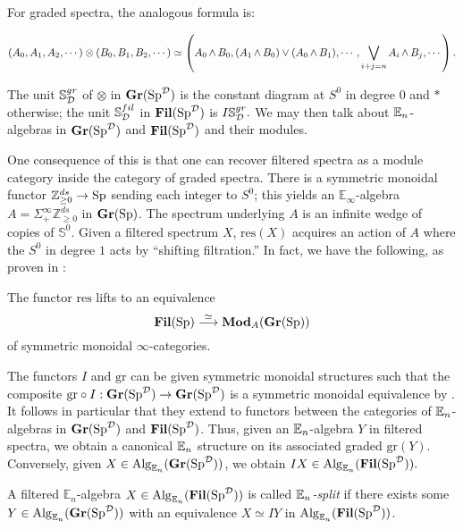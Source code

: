 For graded spectra, the analogous formula is:

$$(A_0,A_1,A_2,\cdots) \otimes (B_0,B_1,B_2,\cdots) \simeq \left( A_0 \smsh B_0, (A_1 \smsh B_0) \vee (A_0 \smsh B_1), \cdots, \bigvee_{i+j=n} A_i \smsh B_j, \cdots \right).$$


The unit $\mathbb{S}^{gr}_{\D}$ of $\otimes$ in $\Gr(\Sp^{\D})$ is the constant diagram at $S^0$ in degree 0 and $*$ otherwise; the unit $\mathbb{S}^{fil}_{\D}$ in $\Fil(\Sp^{\D})$ is $I\mathbb{S}^{gr}_{\D}.$  We may then talk about $\E_n$-algebras in $\Gr(\Sp^{\D})$ and $\Fil(\Sp^{\D})$ and their modules.

\begin{rmk}
One consequence of this is that one can recover filtered spectra as a module category inside the category of graded spectra.  There is a symmetric monoidal functor $\mathbb{Z}^{ds}_{\ge 0} \to \Sp$ sending each integer to $S^0$; this yields an $\mathbb{E}_\infty$-algebra $A=\Sigma^{\infty}_+ \mathbb{Z}^{ds}_{\ge 0}$ in $\Gr(\Sp)$.  The spectrum underlying $A$ is an infinite wedge of copies of $\mathbb{S}^0$.  Given a filtered spectrum $X$, $\mathrm{res }(X)$ acquires an action of $A$ where the $S^0$ in degree $1$ acts by ``shifting filtration.''  In fact, we have the following, as proven in \cite[Proposition 3.1.6]{LurieRot}:

\begin{lem} \label{lem:FilAsGrMod}
The functor $\mathrm{res}$ lifts to an equivalence
$$\Fil(\Sp) \stackrel{\simeq}{\longrightarrow} \mathbf{Mod}_{A}(\Gr(\Sp))$$
of symmetric monoidal $\infty$-categories.
\end{lem}
\end{rmk}  


The functors $I$ and $\text{gr}$ can be given symmetric monoidal structures such that the composite $\text{gr}\circ I : \Gr(\Sp^{\D}) \to \Gr(\Sp^{\D})$ is a symmetric monoidal equivalence by \cite[Proposition 3.2.1]{LurieRot}.  It follows in particular that they extend to functors between the categories of $\E_n$-algebras in $\Gr(\Sp^{\D})$ and $\Fil(\Sp^{\D})$.  Thus, given an $\E_n$-algebra $Y$ in filtered spectra, we obtain a canonical $\E_n$ structure on its associated graded $\text{gr}(Y).$  Conversely, given $X\in \Alg_{\E_n}(\Gr(\Sp^{\D}))$, we obtain $IX\in \Alg_{\E_n}(\Fil(\Sp^{\D})).$  

\begin{dfn}
A filtered $\mathbb{E}_n$-algebra $X\in \Alg_{\E_n}(\Fil(\Sp^{\D}))$ is called \emph{$\E_n$-split} if there exists some $Y \in \Alg_{\E_n}(\Gr(\Sp^{\D}))$ with an equivalence $X \simeq IY$ in $\Alg_{\E_n}(\Fil(\Sp^{\D}))$.  
\end{dfn}

